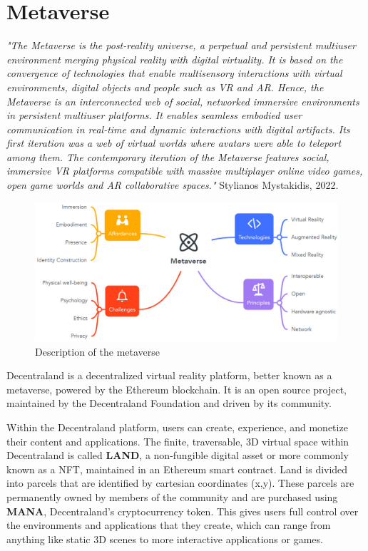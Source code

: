 \documentclass[MSE,Master,english]{twbook}%
\begin{document}
\section{Metaverse\label{dcl}}
\emph{"The Metaverse is the post-reality universe, a perpetual and persistent multiuser environment merging physical reality with digital virtuality. It is based on the convergence of technologies that enable multisensory interactions with virtual environments, digital objects and people such as \ac{VR} and \ac{AR}. Hence, the Metaverse is an interconnected web of social, networked immersive environments in persistent multiuser platforms. It enables seamless embodied user communication in real-time and dynamic interactions with digital artifacts. Its first iteration was a web of virtual worlds where avatars were able to teleport among them. The contemporary iteration of the Metaverse features social, immersive VR platforms compatible with massive multiplayer online video games, open game worlds and AR collaborative spaces."} Stylianos Mystakidis, 2022. \cite{metaverse} \\

\begin{figure}[H]
  \centering
  \includegraphics[width=\textwidth]{metaverse.png}
  \caption{Description of the metaverse \cite{metaverse}}
  \label{fig:metaverse}
\end{figure}

Decentraland\cite{DCL} is a decentralized virtual reality platform, better known as a metaverse, powered by the Ethereum blockchain. It is an open source project, maintained by the Decentraland Foundation and driven by its community. 

Within the Decentraland platform, users can create, experience, and monetize their content and applications. The finite, traversable, 3D virtual space within Decentraland is called \textbf{\gls{LAND}}, a non-fungible digital asset or more commonly known as a \ac{NFT}, maintained in an Ethereum smart contract. Land is divided into parcels that are identified by cartesian coordinates (x,y). These parcels are permanently owned by members of the community and are purchased using \textbf{\gls{MANA}}, Decentraland's cryptocurrency token. This gives users full control over the environments and applications that they create, which can range from anything like static 3D scenes to more interactive applications or games.
\end{document}
